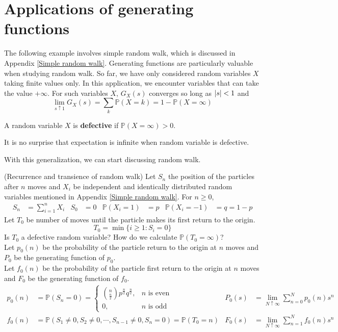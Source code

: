 \documentclass{huhtakm-template-book}
\newcommand{\prob}{\mathbb{P}}
\begin{document}
\section{Applications of generating functions}
The following example involves simple random walk, which is discussed in Appendix \ref{Simple random walk}. Generating functions are particularly valuable when studying random walk. So far, we have only considered random variables $X$ taking finite values only. In this application, we encounter variables that can take the value $+\infty$. For such variables $X$, $G_{X}(s)$ converges so long as $\left|{s}\right|<1$ and
\begin{equation*}
    \lim_{s\uparrow 1}G_{X}(s)=\sum_{k}\prob(X=k)=1-\prob(X=\infty)
\end{equation*}
\begin{defn}
    A random variable $X$ is \textbf{defective} if $\prob(X=\infty)>0$.
\end{defn}
\begin{rem}
    It is no surprise that expectation is infinite when random variable is defective.
\end{rem}
With this generalization, we can start discussing random walk.
\begin{eg}(Recurrence and transience of random walk)
    \label{Simple random walk recurrence and transience}
    Let $S_{n}$ the position of the particles after $n$ moves and $X_{i}$ be independent and identically distributed random variables mentioned in Appendix \ref{Simple random walk}. For $n\geq 0$,
    \begin{align*}
        S_{n}&=\sum_{i=1}^{n}X_{i} & S_{0}&=0 & \prob(X_{i}=1)&=p & \prob(X_{i}=-1)&=q=1-p
    \end{align*}
    Let $T_{0}$ be number of moves until the particle makes its first return to the origin.
    \begin{equation*}
        T_{0}=\min\{i\geq 1:S_{i}=0\}
    \end{equation*}
    Is $T_{0}$ a defective random variable? How do we calculate $\prob(T_{0}=\infty)$?\\
    Let $p_{0}(n)$ be the probability of the particle return to the origin at $n$ moves and $P_{0}$ be the generating function of $p_{0}$.\\
    Let $f_{0}(n)$ be the probability of the particle first return to the origin at $n$ moves and $F_{0}$ be the generating function of $f_{0}$.
    \begin{align*}
        p_{0}(n)&=\prob(S_{n}=0)=\begin{cases}
            \binom{n}{\frac{n}{2}}p^{\frac{n}{2}}q^{\frac{n}{2}}, &n\text{ is even}\\
            0, &n\text{ is odd}
        \end{cases} & P_{0}(s)&=\lim_{N\uparrow\infty}\sum_{n=0}^{N}p_{0}(n)s^{n}\\
        f_{0}(n)&=\prob(S_{1}\neq 0,S_{2}\neq 0,\cdots,S_{n-1}\neq 0,S_{n}=0)=\prob(T_{0}=n) & F_{0}(s)&=\lim_{N\uparrow\infty}\sum_{n=1}^{N}f_{0}(n)s^{n}
    \end{align*}
\end{eg}
\end{document}
